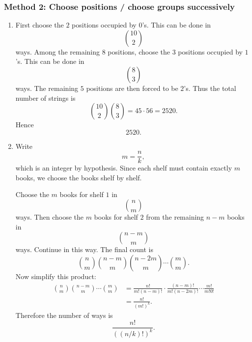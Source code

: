\documentclass[12pt]{article}
\begin{document}
\subsubsection{Method 2: Choose positions / choose groups successively}
\begin{enumerate}[label=(\alph*)]
\item First choose the $2$ positions occupied by $0$'s. This can be done in
\[
\binom{10}{2}
\]
ways. Among the remaining $8$ positions, choose the $3$ positions occupied by $1$'s. This can be done in
\[
\binom{8}{3}
\]
ways. The remaining $5$ positions are then forced to be $2$'s. Thus the total number of strings is
\[
\binom{10}{2}\binom{8}{3}=45\cdot 56=2520.
\]
Hence
\[
\boxed{2520}.
\]

\item Write
\[
m=\frac{n}{k},
\]
which is an integer by hypothesis. Since each shelf must contain exactly $m$ books, we choose the books shelf by shelf.

Choose the $m$ books for shelf $1$ in
\[
\binom{n}{m}
\]
ways. Then choose the $m$ books for shelf $2$ from the remaining $n-m$ books in
\[
\binom{n-m}{m}
\]
ways. Continue in this way. The final count is
\[
\binom{n}{m}\binom{n-m}{m}\binom{n-2m}{m}\cdots \binom{m}{m}.
\]
Now simplify this product:
\begin{align*}
\binom{n}{m}\binom{n-m}{m}\cdots \binom{m}{m}
&=\frac{n!}{m!(n-m)!}\cdot \frac{(n-m)!}{m!(n-2m)!}\cdots \frac{m!}{m!0!}\\
&=\frac{n!}{(m!)^k}.
\end{align*}
Therefore the number of ways is
\[
\boxed{\frac{n!}{\left((n/k)!\right)^k}}.
\]
\end{enumerate}

\newpage
\end{document}
